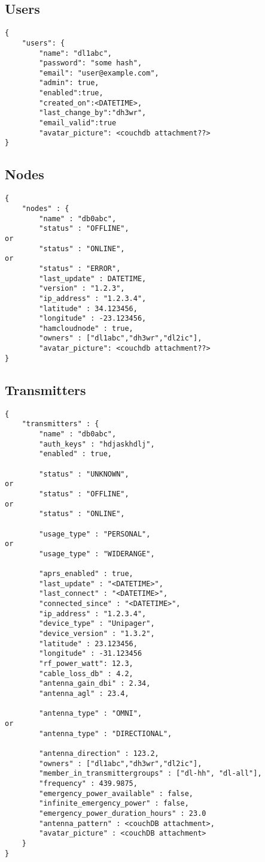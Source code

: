 \documentclass[a4paper]{article}
\begin{document}
\subsection{Users}

\begin{lstlisting}
{
    "users": {
        "name": "dl1abc",
        "password": "some hash",
        "email": "user@example.com",
        "admin": true,
        "enabled":true,
        "created_on":<DATETIME>,
        "last_change_by":"dh3wr",
        "email_valid":true
        "avatar_picture": <couchdb attachment??>
}
\end{lstlisting}

\subsection{Nodes}
\begin{lstlisting}
{
    "nodes" : {
        "name" : "db0abc",
        "status" : "OFFLINE",
or
        "status" : "ONLINE",
or
        "status" : "ERROR",
        "last_update" : DATETIME,
        "version" : "1.2.3",
        "ip_address" : "1.2.3.4",
        "latitude" : 34.123456,
        "longitude" : -23.123456,
        "hamcloudnode" : true,
        "owners" : ["dl1abc","dh3wr","dl2ic"],
        "avatar_picture": <couchdb attachment??>
}
\end{lstlisting}

\subsection{Transmitters}

\begin{lstlisting}
{
    "transmitters" : {
        "name" : "db0abc",
        "auth_keys" : "hdjaskhdlj",
        "enabled" : true,

		"status" : "UNKNOWN",
or
		"status" : "OFFLINE",
or
		"status" : "ONLINE",

		"usage_type" : "PERSONAL",
or
		"usage_type" : "WIDERANGE",
        
        "aprs_enabled" : true,
        "last_update" : "<DATETIME>",
		"last_connect" : "<DATETIME>",
		"connected_since" : "<DATETIME>",
        "ip_address" : "1.2.3.4",
        "device_type" : "Unipager",
        "device_version" : "1.3.2",
        "latitude" : 23.123456,
        "longitude" : -31.123456
        "rf_power_watt": 12.3,
        "cable_loss_db" : 4.2,
        "antenna_gain_dbi" : 2.34,
		"antenna_agl" : 23.4,

		"antenna_type" : "OMNI",
or
		"antenna_type" : "DIRECTIONAL",
    
		"antenna_direction" : 123.2,
        "owners" : ["dl1abc","dh3wr","dl2ic"],
        "member_in_transmittergroups" : ["dl-hh", "dl-all"],
        "frequency" : 439.9875,
        "emergency_power_available" : false,
        "infinite_emergency_power" : false,
		"emergency_power_duration_hours" : 23.0        
        "antenna_pattern" : <couchDB attachment>,
        "avatar_picture" : <couchDB attachment>
    }
}
\end{lstlisting}
\end{document}
